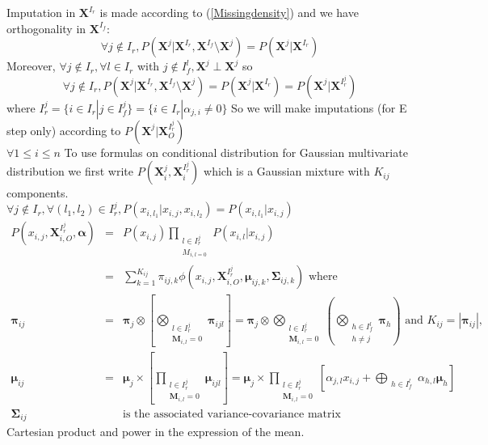 \documentclass[11pt,a4paper]{report}
\begin{document}
Imputation in $\boldsymbol{X}^{I_r}$ is made according to (\ref{Missingdensity}) and we have orthogonality in $\boldsymbol{X}^{I_f}$:
\begin{displaymath}
\forall j \notin I_r, P(\boldsymbol{X}^j|\boldsymbol{X}^{I_r},\boldsymbol{X}^{I_f}\setminus \boldsymbol{X}^j)=P(\boldsymbol{X}^j|\boldsymbol{X}^{I_r})
\end{displaymath}
Moreover, $\forall j \notin I_r, \forall l \in I_r $ with $j \notin I_f^l, \boldsymbol{X}^j\perp \boldsymbol{X}^j$ so
\begin{displaymath}
\forall j \notin I_r, P(\boldsymbol{X}^j|\boldsymbol{X}^{I_r},\boldsymbol{X}^{I_f}\setminus \boldsymbol{X}^j)=P(\boldsymbol{X}^j|\boldsymbol{X}^{I_r})=P(\boldsymbol{X}^j|\boldsymbol{X}^{I_r^j})
\end{displaymath}
where $I_r^j=\{i \in I_r| j \in I_f^j \}=\{i \in I_r|\alpha_{j,i}\neq 0 \}$ So we will make imputations (for E step only) according to $P(\boldsymbol{X}^j|\boldsymbol{X}_O^{I_r^j})$
		\\
$\forall 1 \leq i \leq n$	
To use formulas on conditional distribution for Gaussian multivariate distribution we first write $P(\boldsymbol{X}_i^j,\boldsymbol{X}_i^{I_r^j})$ which is a Gaussian mixture with $K_{ij}$ components.
\\
$\forall j \notin I_r, \forall (l_1,l_2) \in I_r^j, P(x_{i,l_1}|x_{i,j},x_{i,l_2})=P(x_{i,l_1}|x_{i,j})$
\begin{eqnarray}
	P(x_{i,j},\boldsymbol{X}_{i,O}^{I_r^j},\boldsymbol{\alpha})&=& P(x_{i,j})\prod_{\substack{ l \in I_r^j \\M_{i,l=0} } }P(x_{i,l}|x_{i,j}) \\
	&=&\sum_{k =1}^{ K_{ij}} \pi_{ij,k} \phi(x_{i,j},\boldsymbol{X}_{i,O}^{I_r^j},\boldsymbol{\mu}_{ij,k},\boldsymbol{\Sigma}_{ij,k}) \textrm{ where } \\
	\boldsymbol{\pi}_{ij}&=&\boldsymbol{\pi}_j\otimes \left[ \bigotimes_{\substack{l \in I_r^j \\ \boldsymbol{M}_{i,l}=0 } } \boldsymbol{\pi}_{ijl} \right]=\boldsymbol{\pi}_j\otimes\bigotimes_{\substack{l \in I_r^j \\ \boldsymbol{M}_{i,l}=0 } } \left(\bigotimes_{\substack{h \in I_f^l \\ h \neq j} }\boldsymbol{\pi}_h \right)
	 \textrm{ and  }K_{ij}=|\boldsymbol{\pi}_{ij}| ,\\
	\boldsymbol{\mu}_{ij}&=&\boldsymbol{\mu}_j \times \left[\prod_{\substack{l \in I_r^j \\ \boldsymbol{M}_{i,l}=0 }}\boldsymbol{\mu}_{ijl} \right]
		=\boldsymbol{\mu}_j \times \prod_{\substack{l \in I_r^j \\ \boldsymbol{M}_{i,l}=0 }}\left[\alpha_{j,l}x_{i,j}+\bigoplus_{\substack{h \in I_f^l}}\alpha_{h,l}\boldsymbol{\mu}_{h} \right] \\	
		\boldsymbol{\Sigma}_{ij}&& \textrm{is the associated variance-covariance matrix}
\end{eqnarray}
		Cartesian product and power in the expression of the mean.
		
\end{document}
